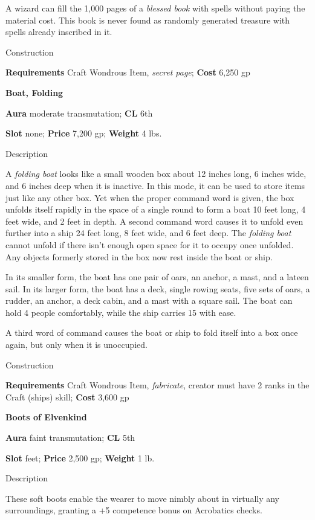 A wizard can fill the 1,000 pages of a \textit{blessed book} with spells without paying the material cost. This book is never found as randomly generated treasure with spells already inscribed in it. 
				
Construction
				
\textbf{Requirements} Craft Wondrous Item, \textit{secret page}; \textbf{Cost }6,250 gp
				
\textbf{Boat, Folding}
				
\textbf{Aura} moderate transmutation;\textbf{ CL }6th
				
\textbf{Slot} none; \textbf{Price} 7,200 gp; \textbf{Weight} 4 lbs.
				
Description
				
A \textit{folding boat} looks like a small wooden box about 12 inches long, 6 inches wide, and 6 inches deep when it is inactive. In this mode, it can be used to store items just like any other box. Yet when the proper command word is given, the box unfolds itself rapidly in the space of a single round to form a boat 10 feet long, 4 feet wide, and 2 feet in depth. A second command word causes it to unfold even further into a ship 24 feet long, 8 feet wide, and 6 feet deep. The \textit{folding boat} cannot unfold if there isn't enough open space for it to occupy once unfolded. Any objects formerly stored in the box now rest inside the boat or ship.
				
In its smaller form, the boat has one pair of oars, an anchor, a mast, and a lateen sail. In its larger form, the boat has a deck, single rowing seats, five sets of oars, a rudder, an anchor, a deck cabin, and a mast with a square sail. The boat can hold 4 people comfortably, while the ship carries 15 with ease.
				
A third word of command causes the boat or ship to fold itself into a box once again, but only when it is unoccupied. 
				
Construction
				
\textbf{Requirements} Craft Wondrous Item, \textit{fabricate}, creator must have 2 ranks in the Craft (ships) skill; \textbf{Cost }3,600 gp
				
\textbf{Boots of Elvenkind}
				
\textbf{Aura} faint transmutation;\textbf{ CL }5th
				
\textbf{Slot} feet; \textbf{Price} 2,500 gp; \textbf{Weight} 1 lb.
				
Description
				
These soft boots enable the wearer to move nimbly about in virtually any surroundings, granting a +5 competence bonus on Acrobatics checks. 
				
